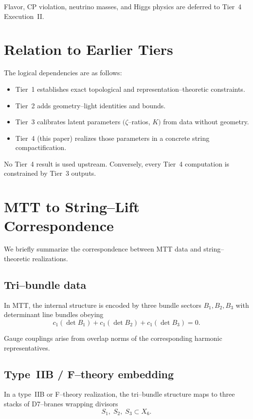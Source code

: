 \documentclass[11pt]{article}
\begin{document}
Flavor, CP violation, neutrino masses, and Higgs physics are deferred to
Tier~4 Execution~II.

\section{Relation to Earlier Tiers}

The logical dependencies are as follows:
\begin{itemize}
  \item Tier~1 establishes exact topological and representation--theoretic
        constraints.
  \item Tier~2 adds geometry--light identities and bounds.
  \item Tier~3 calibrates latent parameters
        $(\zeta$--ratios, $K)$ from data without geometry.
  \item Tier~4 (this paper) realizes those parameters in a concrete
        string compactification.
\end{itemize}

No Tier~4 result is used upstream.
Conversely, every Tier~4 computation is constrained by Tier~3 outputs.

\section{MTT to String--Lift Correspondence}

We briefly summarize the correspondence between MTT data and
string--theoretic realizations.

\subsection{Tri--bundle data}

In MTT, the internal structure is encoded by three bundle sectors
$B_1,B_2,B_3$ with determinant line bundles obeying
\[
c_1(\det B_1)+c_1(\det B_2)+c_1(\det B_3)=0 .
\]

Gauge couplings arise from overlap norms of the corresponding harmonic
representatives.

\subsection{Type~IIB / F--theory embedding}

In a type~IIB or F--theory realization, the tri--bundle structure maps to
three stacks of D7--branes wrapping divisors
\[
S_1,\; S_2,\; S_3 \subset X_6 .
\]
\end{document}
